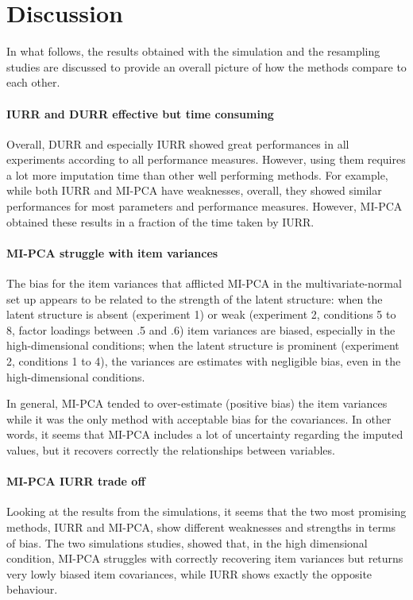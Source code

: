 \section{Discussion}

In what follows, the results obtained with the simulation and the resampling studies are discussed to provide
an overall picture of how the methods compare to each other.

\paragraph{IURR and DURR effective but time consuming}
	Overall, DURR and especially IURR showed great performances in all experiments according to all performance measures.
	However, using them requires a lot more imputation time than other well performing methods.
	For example, while both IURR and MI-PCA have weaknesses, overall, they showed similar performances for most parameters 
	and performance measures.
	However, MI-PCA obtained these results in a fraction of the time taken by IURR.

\paragraph{MI-PCA struggle with item variances}
	The bias for the item variances that afflicted MI-PCA in the multivariate-normal set up appears to be related to 
	the strength of the latent structure: when the latent structure is absent (experiment 1) or weak (experiment 2, 
	conditions 5 to 8, factor loadings between .5 and .6) item variances are biased, especially in the high-dimensional
	conditions; 
	when the latent structure is prominent (experiment 2, conditions 1 to 4), the variances are estimates with 
	negligible bias, even in the high-dimensional conditions.

	In general, MI-PCA tended to over-estimate (positive bias) the item variances while it was the only method
	with acceptable bias for the covariances.
	In other words, it seems that MI-PCA includes a lot of uncertainty regarding the imputed values, but it recovers 
	correctly the relationships between variables.

\paragraph{MI-PCA IURR trade off}
	Looking at the results from the simulations, it seems that the two most promising methods, IURR and MI-PCA, 
	show different weaknesses and strengths in terms of bias.
	The two simulations studies, showed that, in the high dimensional condition, MI-PCA struggles with correctly 
	recovering item variances but returns very lowly biased item covariances, while IURR shows exactly the opposite 
	behaviour.

